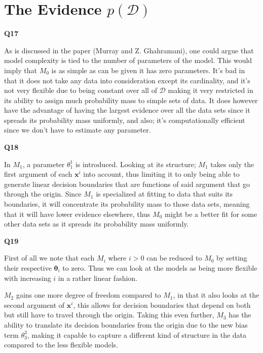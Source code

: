 \documentclass[a4paper]{article}
\begin{document}
\hfil

\section{The Evidence $p(\mathcal{D})$}

\noindent\textbf{Q17}

\noindent\makebox[\linewidth]{\rule{\textwidth}{0.4pt}}
\hfil

\noindent As is discussed in the paper (Murray and Z. Ghahramani), one could argue that model complexity is tied to the number of parameters of the model. This would imply that $M_0$ is as simple as can be given it has zero parameters. It's bad in that it does not take any data into consideration except its cardinality, and it's not very flexible due to being constant over all of $\mathcal{D}$ making it very restricted in its ability to assign much probability mass to simple sets of data. It does however have the advantage of having the largest evidence over all the data sets since it spreads its probability mass uniformly, and also; it's computationally efficient since we don't have to estimate any parameter.

\newpage

\noindent\textbf{Q18}

\noindent\makebox[\linewidth]{\rule{\textwidth}{0.4pt}}
\hfil

\noindent In $M_1$, a parameter $\theta_1^1$ is introduced. Looking at its structure; $M_1$ takes only the first argument of each $\mathbf{x}^i$ into account, thus limiting it to only being able to generate linear decision boundaries that are functions of said argument that go through the origin. Since $M_1$ is specialized at fitting to data that suits its boundaries, it will concentrate its probability mass to those data sets, meaning that it will have lower evidence elsewhere, thus $M_0$ might be a better fit for some other data sets as it spreads its probability mass uniformly.

\hfil

\noindent\textbf{Q19}

\noindent\makebox[\linewidth]{\rule{\textwidth}{0.4pt}}
\hfil

\noindent First of all we note that each $M_i$ where $i>0$ can be reduced to $M_0$ by setting their respective $\boldsymbol{\theta}_i$ to zero. Thus we can look at the models as being more flexible with increasing $i$ in a rather linear fashion.

$M_2$ gains one more degree of freedom compared to $M_1$, in that it also looks at the second argument of $\mathbf{x}^i$, this allows for decision boundaries that depend on both but still have to travel through the origin. Taking this even further, $M_3$ has the ability to translate its decision boundaries from the origin due to the new bias term $\theta_3^3$, making it capable to capture a different kind of structure in the data compared to the less flexible models.  
\end{document}
